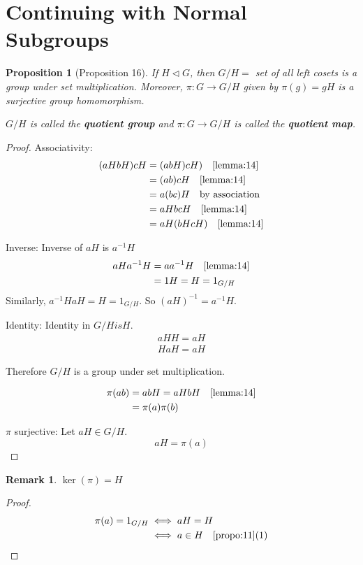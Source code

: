\documentclass[11pt, oneside]{book}
\theoremstyle{break}
\newtheorem*{proof}{Proof}
\newtheorem{propo}{Proposition}[section]
\newtheorem*{remark}{Remark}
\begin{document}
\section{Continuing with Normal Subgroups}\label{sect:normal subgroups cont}

\begin{propo}[Proposition 16]\label{propo:16}
    If $H \triangleleft G$, then $G / H =$ set of all left cosets is a group under set multiplication. Moreover, $\pi : G \to G / H$ given by $\pi(g) = gH$ is a surjective group homomorphism.

    $G / H$ is called the \textbf{quotient group} and $\pi : G \to G / H$ is called the \textbf{quotient map}.
\end{propo}

\begin{proof}
    Associativity:
    \begin{align*}
        (aHbH)cH &= (abH)cH) \quad \autoref{lemma:14} \\
            &= (ab)cH \quad \autoref{lemma:14} \\
            &= a(bc)H \quad \text{by association} \\
            &= aHbcH \quad \autoref{lemma:14} \\
            &= aH(bHcH) \quad \autoref{lemma:14}
    \end{align*}

    Inverse: Inverse of $aH$ is $a^{-1}H$
    \begin{align*}
        aHa^{-1}H &= aa^{-1}H \quad \autoref{lemma:14} \\
            &= 1H = H = 1_{G/H}
    \end{align*}
    Similarly, $a^{-1}HaH = H = 1_{G/H}$. So $(aH)^{-1} = a^{-1}H$.

    Identity: Identity in $G/H is H$.
    \begin{gather*}
        aHH = aH \\
        HaH = aH
    \end{gather*}

    Therefore $G/H$ is a group under set multiplication.

    \begin{align*}
        \pi(ab) &= abH = aHbH \quad \autoref{lemma:14} \\
            &= \pi(a) \pi(b)
    \end{align*}

    $\pi$ surjective: Let $aH \in G/H$.
    \begin{equation}
        aH = \pi(a)
    \end{equation}
\end{proof}

\begin{remark}
    $\ker(\pi) = H$
\end{remark}

\begin{proof}
    \begin{align*}
        \pi(a) = 1_{G/H} &\iff aH = H \\
            &\iff a \in H \quad \autoref{propo:11}\text{(1)}
    \end{align*}
\end{proof}
\end{document}
